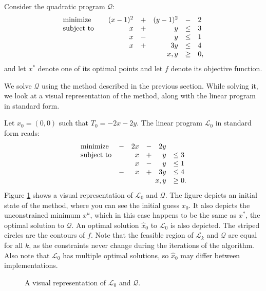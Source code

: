 Consider the quadratic program $\mathcal{Q}$:
\[
\begin{array}{lcrcrcl}
\textrm{minimize}           & &   (x-1)^2 &+&   (y-1)^2 & - &  2 \\
\textrm{subject to}         & &         x &+&         y &\leq& 3 \\
                            & &         x &-&         y &\leq& 1 \\
                            & &         x &+&       3 y &\leq& 4 \\
                 \multicolumn{5}{r}{x,y}                &\geq& 0,
\end{array}
\]
and let $x^*$ denote one of its optimal points and let $f$ denote its objective
function.

We solve $\mathcal{Q}$ using the method described in the previous
section. While solving it, we look at a visual representation of the
method, along with the linear program in standard form.

Let $x_0 = (0,0)$ such that $T_0 = -2x - 2y$. The linear program
$\mathcal{L}_0$ in standard form reads:
\[
\begin{array}{lcrcrl}
    \textrm{minimize}   &-& 2 x &-& 2 y \\
    \textrm{subject to} & &   x &+&   y & \leq 3 \\
                        & &   x &-&   y & \leq 1 \\
                        &-&   x &+& 3 y & \leq 4 \\
     \multicolumn{5}{r}{x,y}            & \geq 0.
\end{array}
\]
Figure \ref{fig:lp1} shows a visual representation of $\mathcal{L}_0$ and
$\mathcal{Q}$.
The figure depicts an initial state
of the method, where you can see the initial guess $x_0$. It also
depicts the unconstrained minimum $x^u$, which in this case
happens to be the same as $x^*$, the optimal solution to
$\mathcal{Q}$. An optimal solution $\hat{x}_0$ to $\mathcal{L}_0$
is also depicted. The striped circles are the contours of $f$.
Note that the feasible region of $\mathcal{L}_k$ and
$\mathcal{Q}$ are equal for all $k$, as the constraints never change during the
iterations of the algorithm. Also note that $\mathcal{L}_0$ has multiple
optimal solutions, so $\hat{x}_0$ may differ between implementations.

\begin{figure}[ht!]
    \centering
    
    \caption{A visual representation of $\mathcal{L}_0$ and $\mathcal{Q}$.}
    \label{fig:lp1}
\end{figure}

